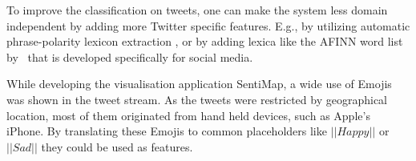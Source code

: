 To improve the classification on tweets, one can make the system less domain independent by adding more Twitter specific features. E.g., by utilizing automatic phrase-polarity lexicon extraction \citep{VelikovichEA:10}, or by adding lexica like the AFINN word list by~\cite{article:afinn} that is developed specifically for social media.

While developing the visualisation application SentiMap, a wide use of Emojis was shown in the tweet stream. As the tweets were restricted by geographical location, most of them originated from hand held devices, such as Apple's iPhone. By translating these Emojis to common placeholders like $||Happy||$ or $||Sad||$ they could be used as features.